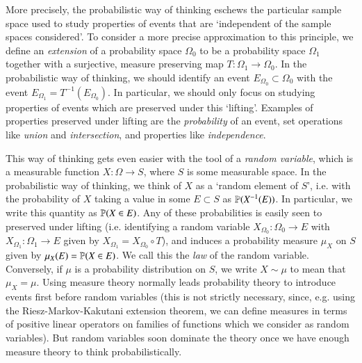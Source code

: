 More precisely, the probabilistic way of thinking eschews the particular sample space used to study properties of events that are `independent of the sample spaces considered'. To consider a more precise approximation to this principle, we define an \emph{extension} of a probability space $\Omega_0$ to be a probability space $\Omega_1$ together with a surjective, measure preserving map $T: \Omega_1 \to \Omega_0$. In the probabilistic way of thinking, we should identify an event $E_{\Omega_0} \subset \Omega_0$ with the event $E_{\Omega_1} = T^{-1}(E_{\Omega_0})$. In particular, we should only focus on studying properties of events which are preserved under this `lifting'. Examples of properties preserved under lifting are the \emph{probability} of an event, set operations like \emph{union} and \emph{intersection}, and properties like \emph{independence}.

This way of thinking gets even easier with the tool of a \emph{random variable}, which is a measurable function $X: \Omega \to S$, where $S$ is some measurable space. In the probabilistic way of thinking, we think of $X$ as a `random element of $S$', i.e. with the probability of $X$ taking a value in some $E \subset S$ as $\operatorname{\mathbb{P}}(X^{-1}(E))$. In particular, we write this quantity as $\operatorname{\mathbb{P}}(X \in E)$. Any of these probabilities is easily seen to preserved under lifting (i.e. identifying a random variable $X_{\Omega_0}: \Omega_0 \to E$ with $X_{\Omega_1}: \Omega_1 \to E$ given by $X_{\Omega_1} = X_{\Omega_0} \circ T$), and induces a probability measure $\mu_X$ on $S$ given by $\mu_X(E) = \operatorname{\mathbb{P}}(X \in E)$. We call this the \emph{law} of the random variable. Conversely, if $\mu$ is a probability distribution on $S$, we write $X \sim \mu$ to mean that $\mu_X = \mu$. Using measure theory normally leads probability theory to introduce events first before random variables (this is not strictly necessary, since, e.g. using the Riesz-Markov-Kakutani extension theorem, we can define measures in terms of positive linear operators on families of functions which we consider as random variables). But random variables soon dominate the theory once we have enough measure theory to think probabilistically.


